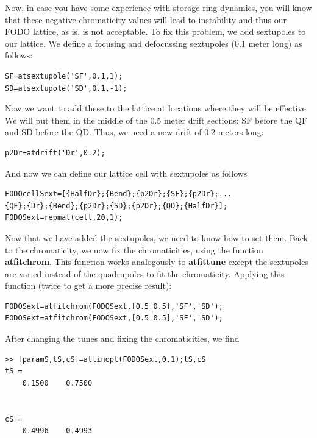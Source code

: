 \documentclass[acus]{article}
\newcommand{\mfun}[1]{{\bf{#1}}}
\begin{document}
Now, in case you have some experience with storage ring dynamics,
you will know that these negative chromaticity values will lead
to instability and thus our FODO lattice, as is, is not acceptable.
To fix this problem, we add sextupoles to our lattice.
We define a focusing and defocussing sextupoles (0.1 meter long)
as follows:
\begin{verbatim}
SF=atsextupole('SF',0.1,1);
SD=atsextupole('SD',0.1,-1);
\end{verbatim}
Now we want to add these to the lattice at locations where they will
be effective.  We will put them in the middle of the 0.5 meter drift
sections: SF before the QF and SD before the QD.  Thus, we need a 
new drift of 0.2 meters long:
\begin{verbatim}
p2Dr=atdrift('Dr',0.2);
\end{verbatim}
And now we can define our lattice cell with sextupoles as follows
\begin{verbatim}
FODOcellSext=[{HalfDr};{Bend};{p2Dr};{SF};{p2Dr};...
{QF};{Dr};{Bend};{p2Dr};{SD};{p2Dr};{QD};{HalfDr}];
FODOSext=repmat(cell,20,1);
\end{verbatim}

Now that we have added the sextupoles, we need to know how to set them.
Back to the chromaticity, we now fix the chromaticities, using the function
\mfun{atfitchrom}.  This function works analogously to \mfun{atfittune} except
the sextupoles are varied instead of the quadrupoles to fit the chromaticity.
Applying this function (twice to get a more precise result):
\begin{verbatim}
FODOSext=atfitchrom(FODOSext,[0.5 0.5],'SF','SD');
FODOSext=atfitchrom(FODOSext,[0.5 0.5],'SF','SD');
\end{verbatim}

After changing the tunes and fixing the chromaticities, we find
\begin{verbatim}
>> [paramS,tS,cS]=atlinopt(FODOSext,0,1);tS,cS
tS =
    0.1500    0.7500


cS =
    0.4996    0.4993
\end{verbatim}
\end{document}
